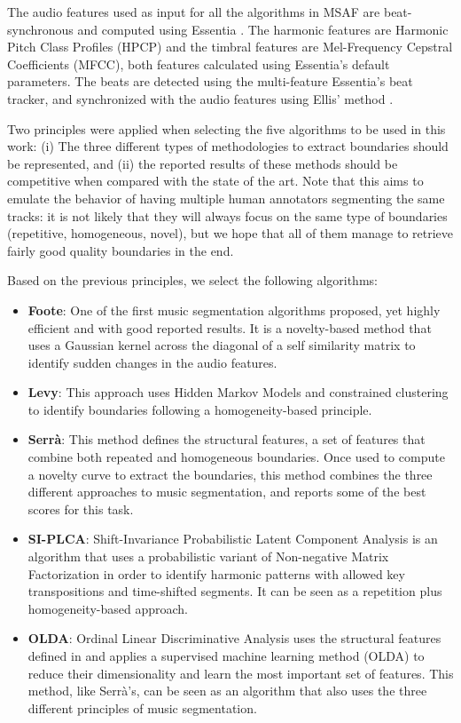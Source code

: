 \documentclass{article}
\begin{document}
The audio features used as input for all the algorithms in MSAF are beat-synchronous and computed using Essentia \cite{Bogdanov2013}.
The harmonic features are Harmonic Pitch Class Profiles (HPCP) and the timbral features are Mel-Frequency Cepstral Coefficients (MFCC), both features calculated using Essentia's default parameters.
The beats are detected using the multi-feature Essentia's beat tracker, and synchronized with the audio features using Ellis' method \cite{Ellis2007}.

Two principles were applied when selecting the five algorithms to be used in this work: (i) The three different types of methodologies to extract boundaries should be represented, and (ii) the reported results of these methods should be competitive when compared with the state of the art.
Note that this aims to emulate the behavior of having multiple human annotators segmenting the same tracks: it is not likely that they will always focus on the same type of boundaries (repetitive, homogeneous, novel), but we hope that all of them manage to retrieve fairly good quality boundaries in the end.

Based on the previous principles, we select the following algorithms:

\begin{itemize}
  \item
    \textbf{Foote}: One of the first music segmentation algorithms proposed, yet highly efficient and with good reported results\cite{Foote1999}. It is a novelty-based method that uses a Gaussian kernel across the diagonal of a self similarity matrix to identify sudden changes in the audio features.
  \item
    \textbf{Levy}: This approach uses Hidden Markov Models and constrained clustering to identify boundaries following a homogeneity-based principle\cite{Levy2008}.
  \item
    \textbf{Serr\`a}: This method defines the structural features, a set of features that combine both repeated and homogeneous boundaries. Once used to compute a novelty curve to extract the boundaries, this method combines the three different approaches to music segmentation, and reports some of the best scores for this task\cite{Serra2013}.
  \item
    \textbf{SI-PLCA}: Shift-Invariance Probabilistic Latent Component Analysis is an algorithm that uses a probabilistic variant of Non-negative Matrix Factorization in order to identify harmonic patterns with allowed key transpositions and time-shifted segments\cite{Weiss2011}. It can be seen as a repetition plus homogeneity-based approach.
  \item 
    \textbf{OLDA}: Ordinal Linear Discriminative Analysis uses the structural features defined in \cite{Serra2013} and applies a supervised machine learning method (OLDA) to reduce their dimensionality and learn the most important set of features\cite{McFee2014}. This method, like Serr\`a's, can be seen as an algorithm that also uses the three different principles of music segmentation.
\end{itemize}
\end{document}
